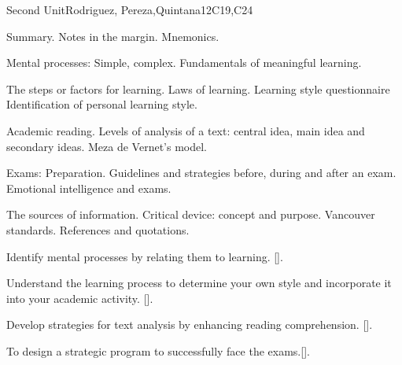 \begin{syllabus}
\begin{unit}{}{Second Unit}{Rodriguez, Pereza,Quintana}{12}{C19,C24}
\begin{topics}
   \item Summary. Notes in the margin. Mnemonics.
   \item Mental processes: Simple, complex. Fundamentals of meaningful learning.
   \item The steps or factors for learning. Laws of learning. Learning style questionnaire Identification of personal learning style.
   \item Academic reading. Levels of analysis of a text: central idea, main idea and secondary ideas. Meza de Vernet's model.
   \item Exams: Preparation. Guidelines and strategies before, during and after an exam. Emotional intelligence and exams.
   \item The sources of information. Critical device: concept and purpose. Vancouver standards. References and quotations.
\end{topics}
\begin{learningoutcomes}
        \item Identify mental processes by relating them to learning. [\Usage].
        \item Understand the learning process to determine your own style and incorporate it into your academic activity. [\Usage].
        \item Develop strategies for text analysis by enhancing reading comprehension. [\Usage].
        \item To design a strategic program to successfully face the exams.[\Usage].
\end{learningoutcomes}
\end{unit}


\end{syllabus}
